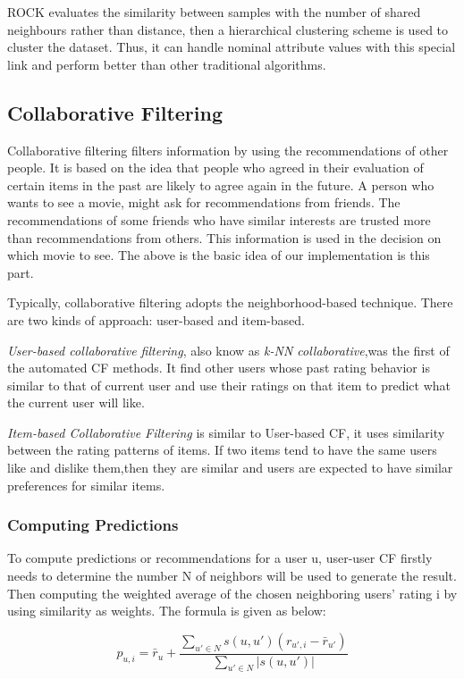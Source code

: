 \documentclass[conference]{IEEEtran}
\begin{document}
ROCK evaluates the similarity between samples with the number of shared neighbours rather than distance, then a hierarchical clustering scheme is used to cluster the dataset. Thus, it can handle nominal attribute values with this special link and perform better than other traditional algorithms\cite{Guha}.

\subsection{Collaborative Filtering}

Collaborative filtering filters information by using the recommendations of other people. It is based on the idea that people who agreed in their evaluation of certain items in the past are likely to agree again in the future. A person who wants to see a movie, might ask for recommendations from friends. The recommendations of some friends who have similar interests are trusted more than recommendations from others. This information is used in the decision on which movie to see. The above is the basic idea of our implementation is this part.

Typically, collaborative filtering adopts the neighborhood-based technique. There are two kinds of approach: user-based and item-based.

\textit{User-based collaborative filtering}, also know as \textit{k-NN collaborative},was the first of the automated CF methods. It find other users whose past rating behavior is similar to that of current user and
use their ratings on that item to predict what the current user will like. 

\textit{Item-based Collaborative Filtering} is similar to User-based CF, it uses similarity between the rating patterns of items. If two items tend to have the same users like and dislike them,then they are similar and users are expected to have similar preferences for similar items.
\subsubsection{Computing Predictions}
To compute predictions or recommendations for a user u, user-user CF firstly needs to determine the number N of neighbors will be used to generate the result. Then computing the weighted average of the chosen neighboring users' rating i by using similarity as weights\cite{survey}. The formula is given as below:

\begin{equation}
p_{u,i} ={\bar r_{u}}  + \frac
{\sum\nolimits_{u' \in N} s(u,u')(r_{u',i} - {\bar r_{u'}})} 
{\sum\nolimits_{u' \in N} |s(u,u')|}
\end{equation}
\end{document}
